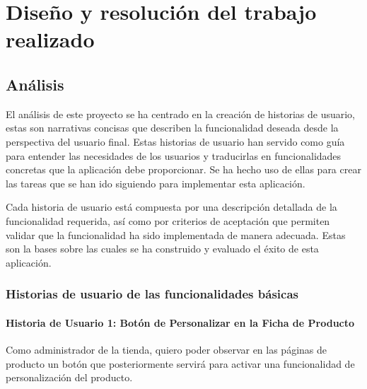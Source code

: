 \documentclass[12pt]{article}
\newcommand{\subsubsubsection}[1]{\paragraph{#1}}
\begin{document}
\clearpage
\section{Diseño y resolución del trabajo realizado}

\subsection{Análisis}
El análisis de este proyecto se ha centrado en la creación de historias de usuario, estas son narrativas 
concisas que describen la funcionalidad deseada desde la perspectiva del usuario final. 
Estas historias de usuario han servido como guía para entender las necesidades de los usuarios y traducirlas en 
funcionalidades concretas que  la aplicación debe proporcionar. Se ha hecho uso de ellas para crear
las tareas que se han ido siguiendo para implementar esta aplicación.

Cada historia de usuario está compuesta por una descripción detallada de la funcionalidad requerida, así como por criterios de aceptación que 
permiten validar que la funcionalidad ha sido implementada de manera adecuada. Estas son la bases sobre las cuales se ha construido y evaluado el éxito de esta aplicación.

\subsubsection{Historias de usuario de las funcionalidades básicas}

\subsubsubsection{Historia de Usuario 1: Botón de Personalizar en la Ficha de Producto}\label{sec:historia1}

Como administrador de la tienda, quiero poder observar en las páginas de producto un botón que posteriormente servirá para activar una funcionalidad de personalización del producto.
\end{document}

